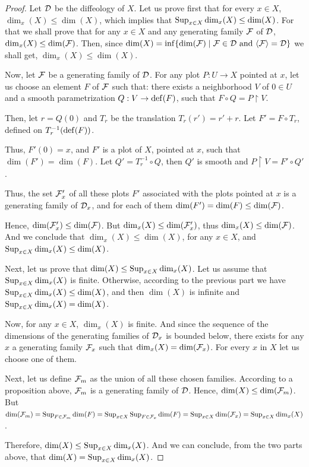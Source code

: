 \begin{proof} Let $\mathcal{D}$ be the diffeology of $X$.
  Let us prove first that for every $x \in X$, $\dim_x(X) \leq \dim(X)$,
  which implies that $\operatorname{Sup}_{x \in X} \dim_x(X) \leq \dim(X)$.
  For that we shall prove that for any $x \in X$ and any generating family $\mathcal{F}$ of $\mathcal{D}$,
  $\dim_x(X) \leq \dim(\mathcal{F})$.
  Then,
  since $\dim(X) = \inf \{ \dim(\mathcal{F}) \mid \mathcal{F} \in \mathcal{D} \text{ and } \langle \mathcal{F} \rangle = \mathcal{D} \}$ we shall get,
  $\dim_x(X) \leq \dim(X)$.
  
  Now,
  let $\mathcal{F}$ be a generating family of $\mathcal{D}$.
  For any plot $P \colon U \to X$ pointed at $x$,
  let us choose an element $F$ of $\mathcal{F}$ such that:
  there exists a neighborhood $V$ of $0 \in U$ and a smooth parametrization $Q : V \to {\rm def}(F)$,
  such that $F \circ Q = P \restriction V$.
  
  Then,
  let $r = Q(0)$ and $T_r$ be the translation $T_r(r') = r' + r$.
  Let $F' = F \circ T_r$,
  defined on $T_r^{-1}({\rm def}(F))$.
  
  Thus,
  $F'(0) = x$,
  and $F'$ is a plot of $X$,
  pointed at $x$,
  such that $\dim(F') = \dim(F)$.
  Let $Q' = T_r^{-1} \circ Q$,
  then $Q'$ is smooth and $P \restriction V = F' \circ Q'$.
  
  Thus,
  the set $\mathcal{F}'_x$ of all these plots $F'$ associated with the plots pointed at $x$ is a generating family of $\mathcal{D}_x$,
  and for each of them $\dim(F') = \dim(F) \leq \dim(\mathcal{F})$.
  
  Hence,
  $\dim(\mathcal{F}'_x) \leq \dim(\mathcal{F})$.
  But $\dim_x(X) \leq \dim(\mathcal{F}'_x)$,
  thus $\dim_x(X) \leq \dim(\mathcal{F})$.
  And we conclude that $\dim_x(X) \leq \dim(X)$,
  for any $x \in X$,
  and $\operatorname{Sup}_{x \in X} \dim_x(X) \leq \dim(X)$.
  
  Next,
  let us prove that $\dim(X) \leq \operatorname{Sup}_{x \in X} \dim_x(X)$.
  Let us assume that $\operatorname{Sup}_{x \in X} \dim_x(X)$ is finite.
  Otherwise,
  according to the
  previous part we have $\operatorname{Sup}_{x \in X} \dim_x(X) \leq \dim(X)$,
  and then $\dim(X)$ is infinite and $\operatorname{Sup}_{x \in X} \dim_x(X) = \dim(X)$.
  
  Now,
  for any $x \in X$,
  $\dim_x(X)$ is finite.
  And since the sequence of the dimensions of the generating families of $\mathcal{D}_x$ is bounded below,
  there exists for any $x$ a generating family $\mathcal{F}_x$ such that $\dim_x(X) = \dim(\mathcal{F}_x)$.
  For every $x$ in $X$ let us choose one of them.
  
  Next,
  let us define $\mathcal{F}_m$ as the union of all these chosen families.
  According to a proposition above,
  $\mathcal{F}_m$ is a generating family of $\mathcal{D}$.
  Hence, $\dim(X) \leq \dim(\mathcal{F}_m)$.
  But $\dim(\mathcal{F}_m) = \operatorname{Sup}_{F \in \mathcal{F}_m} \dim(F) = \operatorname{Sup}_{x \in X} \operatorname{Sup}_{F \in \mathcal{F}_x} \dim(F) = \operatorname{Sup}_{x \in X} \dim(\mathcal{F}_x) = \operatorname{Sup}_{x \in X} \dim_x(X)$.
  
  Therefore,
  $\dim(X) \leq \operatorname{Sup}_{x \in X} \dim_x(X)$.
  And we can conclude,
  from the two parts above,
  that $\dim(X) = \operatorname{Sup}_{x \in X} \dim_x(X)$.
\end{proof}

